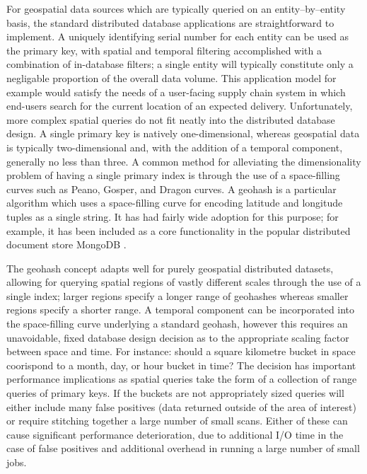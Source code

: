 \documentclass[nips13submit_09,times,art10]{article} %
\begin{document}
For geospatial data sources which are typically queried on an entity--by--entity basis, the
standard distributed database applications are straightforward to implement. A uniquely
identifying serial number for each entity can be used as the primary key, with spatial
and temporal filtering accomplished with a combination of in-database filters; a single
entity will typically constitute only a negligable proportion of the overall data volume.
This application model for example would satisfy the needs of a user-facing supply chain
system in which end-users search for the current location of an expected delivery.
Unfortunately, more complex spatial queries do not fit neatly into the distributed database
design. A single primary key is natively one-dimensional, whereas geospatial data
is typically two-dimensional and, with the addition of a temporal component, generally
no less than three. A common method for alleviating the dimensionality problem of having a single primary
index is through the use of a space-filling curves such as Peano, Gosper, and Dragon
curves. A geohash is a particular algorithm which uses a space-filling curve for
encoding latitude and longitude tuples as a single string. It has had fairly wide adoption
for this purpose; for example, it has been included as a core functionality in the popular
distributed document store MongoDB \cite{chodorow2013mongodb}.

The geohash concept adapts well for purely geospatial distributed datasets, allowing for
querying spatial regions of vastly different scales through the use of a single index; larger
regions specify a longer range of geohashes whereas smaller regions specify a shorter range.
A temporal component can be incorporated into the space-filling curve underlying a standard
geohash, however this requires an unavoidable, fixed database design decision as to the
appropriate scaling factor between space and time. For instance: should a square kilometre
bucket in space coorispond to a month, day, or hour bucket in time? The decision has
important performance implications as spatial queries take the form of a collection of
range queries of primary keys. If the buckets are not appropriately sized queries will either
include many false positives (data returned outside of the area of interest) or require
stitching together a large number of small scans. Either of these can cause significant
performance deterioration, due to additional I/O time in the case of false positives and
additional overhead in running a large number of small jobs.
\end{document}

